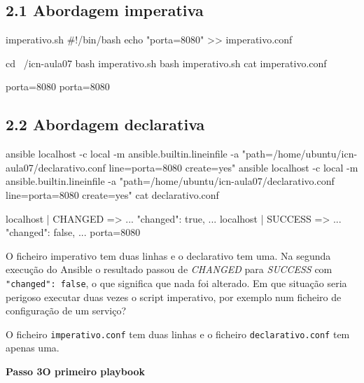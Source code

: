 \documentclass[11pt,a4paper]{article}
\newcommand{\passo}[2]{%
  \clearpage
  \begin{tcolorbox}[colback=SageMuted, colframe=SageMuted, coltext=white,
    boxrule=0pt, arc=4pt, left=14pt, right=14pt, top=10pt, bottom=10pt,
    before skip=0pt, after skip=0.6cm]
  {\Large\bfseries Passo #1}\hfill{\large\bfseries #2}
  \end{tcolorbox}
}
\newcommand{\cmd}[1]{\texttt{#1}}
\begin{document}
\subsection*{2.1 Abordagem imperativa}

\begin{ficheiro}{imperativo.sh}
#!/bin/bash
echo "porta=8080" >> imperativo.conf
\end{ficheiro}

\begin{terminal}
cd ~/icn-aula07
bash imperativo.sh
bash imperativo.sh
cat imperativo.conf
\end{terminal}

\begin{saida}
porta=8080
porta=8080
\end{saida}

\subsection*{2.2 Abordagem declarativa}

\begin{terminal}
ansible localhost -c local -m ansible.builtin.lineinfile -a "path=/home/ubuntu/icn-aula07/declarativo.conf line=porta=8080 create=yes"
ansible localhost -c local -m ansible.builtin.lineinfile -a "path=/home/ubuntu/icn-aula07/declarativo.conf line=porta=8080 create=yes"
cat declarativo.conf
\end{terminal}

\begin{saida}
localhost | CHANGED => { ... "changed": true, ... }
localhost | SUCCESS => { ... "changed": false, ... }
porta=8080
\end{saida}

\begin{observe}
O ficheiro imperativo tem duas linhas e o declarativo tem uma. Na segunda execução do Ansible o resultado passou de \emph{CHANGED} para \emph{SUCCESS} com \cmd{"changed": false}, o que significa que nada foi alterado. Em que situação seria perigoso executar duas vezes o script imperativo, por exemplo num ficheiro de configuração de um serviço?
\end{observe}

\begin{feito}
O ficheiro \cmd{imperativo.conf} tem duas linhas e o ficheiro \cmd{declarativo.conf} tem apenas uma.
\end{feito}

\passo{3}{O primeiro playbook}
\end{document}

